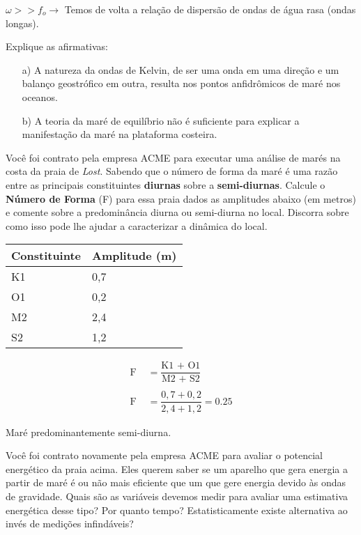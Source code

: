 \documentclass[letterpaper,portuguese,12pt,pdftex]{exam}
\begin{document}
\begin{questions}
\begin{parts}
\begin{solution}
\raggedright
  $\omega >> f_o \rightarrow$ Temos de volta a relação de dispersão de ondas de
  água rasa (ondas longas).\\
\end{solution}
\end{parts}

\question[2]
Explique as afirmativas:
\begin{itemize}
  \item[a)] A natureza da ondas de Kelvin, de ser uma onda em uma direção e um
        balanço geostrófico em outra, resulta nos pontos anfidrômicos de maré
        nos oceanos.
  \item[b)] A teoria da maré de equilíbrio não é suficiente para explicar a
            manifestação da maré na plataforma costeira.
\end{itemize}

\question[3]
Você foi contrato pela empresa ACME\circledR{} para executar uma análise de
marés na costa da praia de {\it Lost}.  Sabendo que o número de forma da maré é uma
razão entre as principais constituintes {\bf diurnas} sobre a
{\bf semi-diurnas}. Calcule o {\bf Número de Forma} (F) para essa praia dados as
amplitudes abaixo (em metros) e comente sobre a predominância diurna ou
semi-diurna no local.  Discorra sobre como isso pode lhe ajudar a caracterizar
a dinâmica do local.

\begin{center}
\begin{tabular}{ll}
Constituinte & Amplitude (m)\\
\hline
K1 & 0,7 \\
O1 & 0,2 \\
M2 & 2,4 \\
S2 & 1,2 \\
\hline
\end{tabular}
\end{center}


\begin{solution}
  \begin{align*}
    \text{F} &= \dfrac{\text{K1 + O1}}{\text{M2 + S2}} \\
    \quad \\
    \text{F} &= \dfrac{0,7 + 0,2}{2,4 + 1,2} = 0.25
  \end{align*}

  Maré predominantemente semi-diurna.
\end{solution}

\question[3]
Você foi contrato novamente pela empresa ACME\circledR{} para avaliar o
potencial energético da praia acima.  Eles querem saber se um aparelho que gera
energia a partir de maré é ou não mais eficiente que um que gere energia devido
às ondas de gravidade.  Quais são as variáveis devemos medir para avaliar
uma estimativa energética desse tipo?  Por quanto tempo?  Estatisticamente
existe alternativa ao invés de medições infindáveis?


\end{questions}
\end{document}
